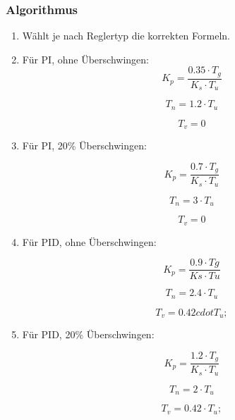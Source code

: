 \subsubsection*{Algorithmus}
\begin{enumerate}
    \item
        W\"ahlt je nach Reglertyp die korrekten Formeln.
    \item
        F\"ur PI, ohne \"Uberschwingen:
        \begin{equation*}
            K_p= \frac{0.35 \cdot T_g}{K_s \cdot T_u}
        \end{equation*}

        \begin{equation*}
            T_n=1.2 \cdot T_u
        \end{equation*}

        \begin{equation*}
            T_v=0
        \end{equation*}

    \item
        F\"ur PI, 20\% \"Uberschwingen:

        \begin{equation*}
            K_p= \frac{0.7 \cdot T_g}{K_s \cdot T_u}
        \end{equation*}

        \begin{equation*}
            T_n=3 \cdot T_u
        \end{equation*}

        \begin{equation*}
            T_v=0
        \end{equation*}
    \item
        F\"ur PID, ohne \"Uberschwingen:

        \begin{equation*}
            K_p = \frac{0.9 \cdot Tg}{Ks \cdot Tu}
        \end{equation*}

        \begin{equation*}
            T_n=2.4 \cdot T_u
        \end{equation*}

        \begin{equation*}
            T_v=0.42 cdot T_u;
        \end{equation*}
    \item
        F\"ur PID, 20\% \"Uberschwingen:

        \begin{equation*}
            K_p = \frac{1.2 \cdot T_g}{K_s \cdot T_u}
        \end{equation*}

        \begin{equation*}
            T_n=2 \cdot T_u
        \end{equation*}

        \begin{equation*}
            T_v=0.42 \cdot T_u;
        \end{equation*}
\end{enumerate}

